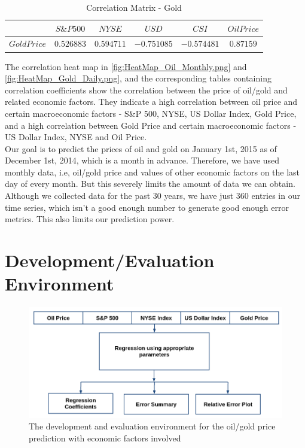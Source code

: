 \documentclass[runningheads]{llncs}
\begin{document}
\begin{table}
\begin{center}
\begin{tabular}{|c|c|c|c|c|c|}
\hline
$ $ & $ S\&P 500 $ & $ NYSE $ & $ USD $  & $CSI$ &$Oil Price$ \\  \hline
$Gold Price$ & $0.526883$ & $0.594711$ & $-0.751085$ & $-0.574481$ & $0.87159$ \\ \hline
\end{tabular}
\end{center}
\caption{Correlation Matrix - Gold}
\end{table}

\newpage
The correlation heat map in \autoref{fig:HeatMap_Oil_Monthly.png} and \autoref{fig:HeatMap_Gold_Daily.png}, and the corresponding tables containing correlation coefficients show the correlation between the price of oil/gold and related economic factors. They indicate a high correlation between oil price and certain macroeconomic factors - S\&P 500, NYSE, US Dollar Index, Gold Price, and a high correlation between Gold Price and certain macroeconomic factors - US Dollar Index, NYSE and Oil Price.\\

\noindent Our goal is to predict the prices of oil and gold on January 1st, 2015 as of December 1st, 2014, which is a month in advance. Therefore, we have used monthly data, i.e, oil/gold price and values of other economic factors on the last day of every month. But this severely limits the amount of data we can obtain. Although we collected data for the past 30 years, we have just 360 entries in our time series, which isn't a good enough number to generate good enough error metrics. This also limits our prediction power. \\

\newpage
\section{Development/Evaluation Environment}

\begin{figure}
\centering
\includegraphics[width=\textwidth]{DevelopmentFlowchart.png}
\caption{The development and evaluation environment for the oil/gold price prediction with economic factors involved}
\label{fig:DevelopmentFlowchart.png}
\end{figure}
\end{document}
